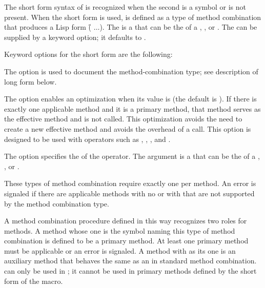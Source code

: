 The short form syntax of  is recognized
when the second  is a  symbol or is not present.
When the short form is used,  is defined as a type of
method combination that produces a Lisp form
\f{({   $\ldots$})}.
The  is a  that can be the  of a 
, , or .  
The  can be supplied by a keyword option;
it defaults to .
 
Keyword options for the short form are the following:
 
\beginlist
 
\itemitem{\bull}
The  option is used to document the method-combination type;
see description of long form below.
 
\itemitem{\bull}
The  option enables an optimization
when its value is  (the default is ).  If there is
exactly one applicable method and it is a primary method, that method
serves as the effective method and  is not called.
This optimization avoids the need to create a new effective method and
avoids the overhead of a  call.  This option is designed to be
used with operators such as , , \funref{$+$}, and
.
     
\itemitem{\bull}
The  option specifies the  of the operator.  The
 argument is a  that can be the 
 of a ,
, or 
.  
 
\endlist
 
 
These types of method combination require exactly one  per
method.  An error is signaled if there are applicable methods with no
 or with  that are not supported by 
the method combination type. 
 
A method combination procedure defined in this way recognizes two
roles for methods.  A method whose one  is the symbol naming
this type of method combination is defined to be a primary method.  At
least one primary method must be applicable or an error is signaled.
A method with  as its one  is an auxiliary
method that behaves the same as an  in standard
method combination.   can only be
used in ; it cannot be used in primary methods
defined by the short form of the  macro.
 
